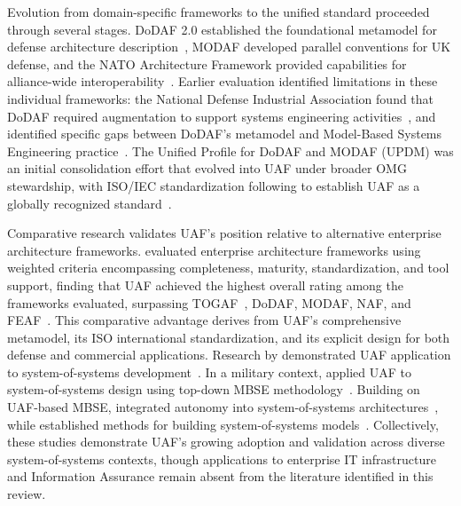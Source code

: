 Evolution from domain-specific frameworks to the unified standard proceeded through several stages. DoDAF 2.0 established the foundational metamodel for defense architecture description~\parencite{DoDAF_2009}, MODAF developed parallel conventions for UK defense, and the NATO Architecture Framework provided capabilities for alliance-wide interoperability~\parencite{NATO_NAF_2018}. Earlier evaluation identified limitations in these individual frameworks: the National Defense Industrial Association found that DoDAF required augmentation to support systems engineering activities~\parencite{NDIA_SE_DoDAF_2011}, and \citeauthor{Hause_2010} identified specific gaps between DoDAF's metamodel and Model-Based Systems Engineering practice~\parencite{Hause_2010}. The Unified Profile for DoDAF and MODAF (UPDM) was an initial consolidation effort that evolved into UAF under broader OMG stewardship, with ISO/IEC standardization following to establish UAF as a globally recognized standard~\parencite{OMG_UAF_UPDM_2017}.

Comparative research validates UAF's position relative to alternative enterprise architecture frameworks. \citeauthor{Bankauskaite_2019} evaluated enterprise architecture frameworks using weighted criteria encompassing completeness, maturity, standardization, and tool support, finding that UAF achieved the highest overall rating among the frameworks evaluated, surpassing TOGAF~\parencite{TOGAF_2018}, DoDAF, MODAF, NAF, and FEAF~\parencite{Bankauskaite_2019}. This comparative advantage derives from UAF's comprehensive metamodel, its ISO international standardization, and its explicit design for both defense and commercial applications. Research by \citeauthor{Eichmann_Melzer_God_2019} demonstrated UAF application to system-of-systems development~\parencite{Eichmann_Melzer_God_2019}. In a military context, \citeauthor{Liu_2023} applied UAF to system-of-systems design using top-down MBSE methodology~\parencite{Liu_2023}. Building on UAF-based MBSE, \citeauthor{Torkjazi_2024} integrated autonomy into system-of-systems architectures~\parencite{Torkjazi_2024}, while \citeauthor{Abhaya_2021} established methods for building system-of-systems models~\parencite{Abhaya_2021}. Collectively, these studies demonstrate UAF's growing adoption and validation across diverse system-of-systems contexts, though applications to enterprise IT infrastructure and Information Assurance remain absent from the literature identified in this review.

